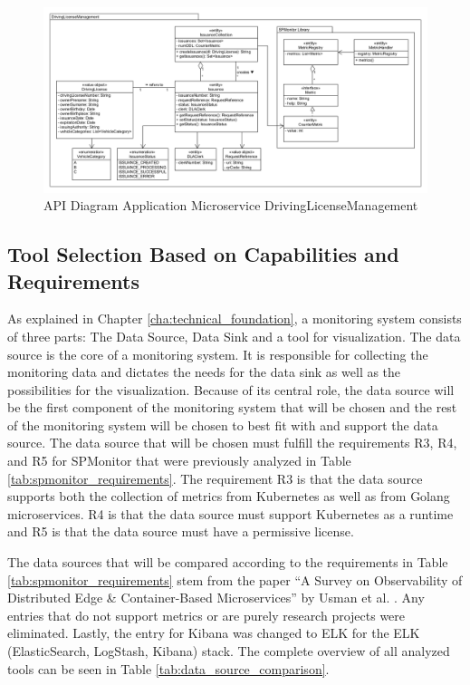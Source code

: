 \begin{figure}[tb]
  \centering
  \includegraphics[width=\textwidth]{figures/api_diagram_drivinglicensemanagement.png}
  \caption{API Diagram Application Microservice DrivingLicenseManagement}
  \label{fig:api_diagram_drivinglicensemanagement}
\end{figure}

\subsection{Tool Selection Based on Capabilities and Requirements}

As explained in Chapter \ref{cha:technical_foundation}, a monitoring system
consists of three parts: The Data Source, Data Sink and a tool for
visualization. The data source is the core of a monitoring system. It is
responsible for collecting the monitoring data and dictates the needs for the
data sink as well as the possibilities for the visualization. Because of its
central role, the data source will be the first component of the monitoring
system that will be chosen and the rest of the monitoring system will be chosen
to best fit with and support the data source. The data source that will be
chosen must fulfill the requirements R3, R4, and R5 for SPMonitor that were
previously analyzed in Table \ref{tab:spmonitor_requirements}. The requirement
R3 is that the data source supports both the collection of metrics from
Kubernetes as well as from Golang microservices. R4 is that the data source
must support Kubernetes as a runtime and R5 is that the data source must have a
permissive license.

The data sources that will be compared according to the requirements in Table
\ref{tab:spmonitor_requirements} stem from the paper \enquote{A Survey on Observability of Distributed Edge {\&} Container-Based Microservices} by Usman
et al. \cite{UF+22}. Any entries that do not support metrics or are purely
research projects were eliminated. Lastly, the entry for Kibana was changed to
ELK for the ELK (ElasticSearch, LogStash, Kibana) stack. The complete overview
of all analyzed tools can be seen in Table \ref{tab:data_source_comparison}.

